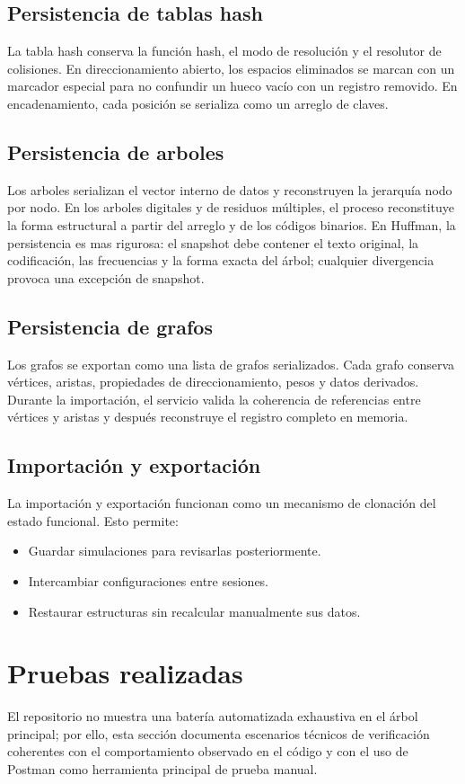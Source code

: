 \documentclass[12pt,onecolumn]{IEEEtran}
\begin{document}
\subsection{Persistencia de tablas hash}
La tabla hash conserva la función hash, el modo de resolución y el resolutor de colisiones. En direccionamiento abierto, los espacios eliminados se marcan con un marcador especial para no confundir un hueco vacío con un registro removido. En encadenamiento, cada posición se serializa como un arreglo de claves.

\subsection{Persistencia de arboles}
Los arboles serializan el vector interno de datos y reconstruyen la jerarquía nodo por nodo. En los arboles digitales y de residuos múltiples, el proceso reconstituye la forma estructural a partir del arreglo y de los códigos binarios. En Huffman, la persistencia es mas rigurosa: el snapshot debe contener el texto original, la codificación, las frecuencias y la forma exacta del árbol; cualquier divergencia provoca una excepción de snapshot.

\subsection{Persistencia de grafos}
Los grafos se exportan como una lista de grafos serializados. Cada grafo conserva vértices, aristas, propiedades de direccionamiento, pesos y datos derivados. Durante la importación, el servicio valida la coherencia de referencias entre vértices y aristas y después reconstruye el registro completo en memoria.

\subsection{Importación y exportación}
La importación y exportación funcionan como un mecanismo de clonación del estado funcional. Esto permite:
\begin{itemize}
  \item Guardar simulaciones para revisarlas posteriormente.
  \item Intercambiar configuraciones entre sesiones.
  \item Restaurar estructuras sin recalcular manualmente sus datos.
\end{itemize}

\section{Pruebas realizadas}
El repositorio no muestra una batería automatizada exhaustiva en el árbol principal; por ello, esta sección documenta escenarios técnicos de verificación coherentes con el comportamiento observado en el código y con el uso de Postman como herramienta principal de prueba manual.
\end{document}
